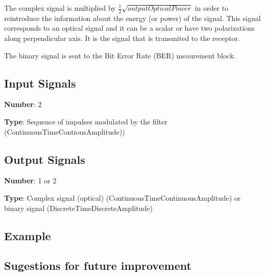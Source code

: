 \documentclass[a4paper]{article}
\begin{document}
The complex signal is multiplied by $\frac{1}{2}\sqrt{\textit{outputOpticalPower}}$ in order to reintroduce the information about the energy (or power) of the signal. This signal corresponds to an optical signal and it can be a scalar or have two polarizations along perpendicular axis. It is the signal that is transmited to the receptor. 

The binary signal is sent to the Bit Error Rate (BER) meaurement block.

\subsection*{Input Signals}

\textbf{Number}: 2

\textbf{Type}: Sequence of impulses modulated by the filter (ContinuousTimeContiousAmplitude))

\subsection*{Output Signals}

\textbf{Number}: 1 or 2

\textbf{Type}: Complex signal (optical) (ContinuousTimeContinuousAmplitude) or binary signal (DiscreteTimeDiscreteAmplitude)

\subsection*{Example}

\subsection*{Sugestions for future improvement}
\end{document}
